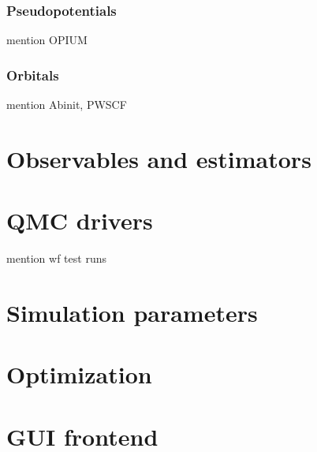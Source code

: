 \subsubsection{Pseudopotentials}
mention OPIUM
\subsubsection{Orbitals}
mention Abinit, PWSCF
\section{Observables and estimators}
\section{QMC drivers}
mention wf test runs
\section{Simulation parameters}
\section{Optimization}
\section{GUI frontend}


